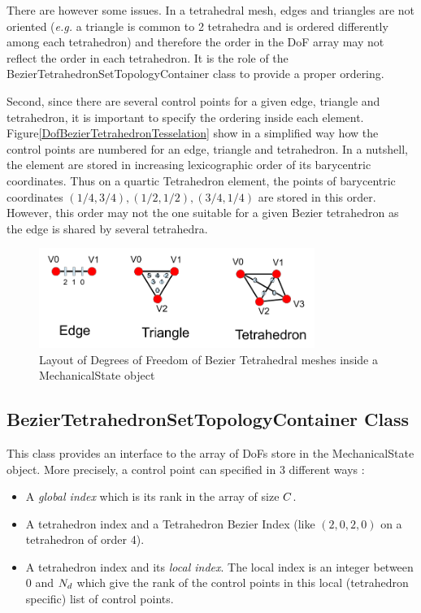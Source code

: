 \documentclass[a4paper,11pt]{article}
\begin{document}
There are however some issues. In a tetrahedral mesh, edges and triangles are not oriented ({\em e.g.} a triangle is common to 2 tetrahedra and is ordered differently among each tetrahedron) and therefore the order in the DoF array may not reflect the order in each tetrahedron. It is the role of the BezierTetrahedronSetTopologyContainer class to provide a proper ordering.

Second, since there are several control points for a given edge, triangle and tetrahedron, it is important to specify the ordering inside each element. Figure\ref{DofBezierTetrahedronTesselation} show in a simplified way how the control points are numbered for an edge, triangle and tetrahedron. In a nutshell, the element are stored in increasing lexicographic order of its barycentric coordinates. Thus on a quartic Tetrahedron element, the points of barycentric coordinates $(1/4, 3/4), (1/2,1/2), (3/4, 1/4)$ are stored in this order. However, this order may not the one suitable for a given Bezier tetrahedron as the edge is shared by several tetrahedra.

\begin{figure}[!htbp]
	\centering
    \includegraphics[width=0.80\textwidth]{DofBezierTetrahedronTesselation}
	\caption{Layout of Degrees of Freedom of Bezier Tetrahedral meshes inside a MechanicalState object}
	\label{fig:LayoutBezierTetrahedron}
\end{figure}

\subsection{BezierTetrahedronSetTopologyContainer Class}

This class provides an interface to the array of DoFs store in the MechanicalState object. More precisely, a control point can specified in 3 different ways :

\begin{itemize}
	\item A {\em global index} which is its rank in the array of size ${C}$.
	\item A tetrahedron index and a Tetrahedron Bezier Index (like $(2,0,2,0)$ on a tetrahedron of order 4).
	\item A tetrahedron index and its {\em local index}. The local index is an integer between 0 and $N_{d}$ which give the rank of the control points in this local (tetrahedron specific) list of control points.
\end{itemize}
\end{document}
